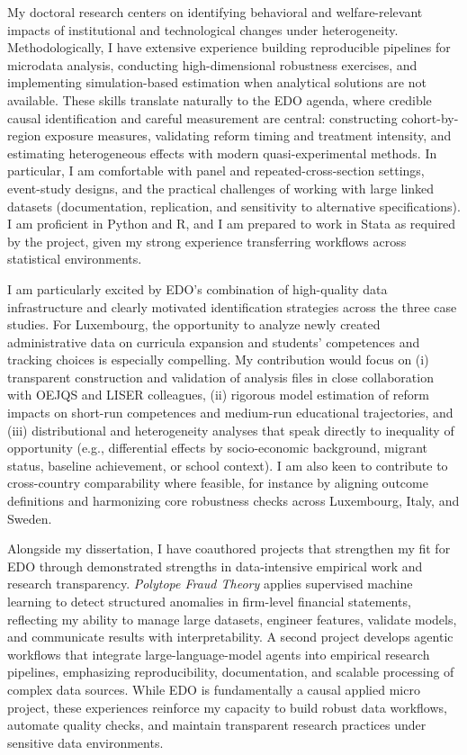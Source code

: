 \documentclass[11pt]{article}
\begin{document}
My doctoral research centers on identifying behavioral and welfare-relevant impacts of institutional and technological changes under heterogeneity. Methodologically, I have extensive experience building reproducible pipelines for microdata analysis, conducting high-dimensional robustness exercises, and implementing simulation-based estimation when analytical solutions are not available. These skills translate naturally to the EDO agenda, where credible causal identification and careful measurement are central: constructing cohort-by-region exposure measures, validating reform timing and treatment intensity, and estimating heterogeneous effects with modern quasi-experimental methods. In particular, I am comfortable with panel and repeated-cross-section settings, event-study designs, and the practical challenges of working with large linked datasets (documentation, replication, and sensitivity to alternative specifications). I am proficient in Python and R, and I am prepared to work in Stata as required by the project, given my strong experience transferring workflows across statistical environments.

I am particularly excited by EDO's combination of high-quality data infrastructure and clearly motivated identification strategies across the three case studies. For Luxembourg, the opportunity to analyze newly created administrative data on curricula expansion and students' competences and tracking choices is especially compelling. My contribution would focus on (i) transparent construction and validation of analysis files in close collaboration with OEJQS and LISER colleagues, (ii) rigorous model estimation of reform impacts on short-run competences and medium-run educational trajectories, and (iii) distributional and heterogeneity analyses that speak directly to inequality of opportunity (e.g., differential effects by socio-economic background, migrant status, baseline achievement, or school context). I am also keen to contribute to cross-country comparability where feasible, for instance by aligning outcome definitions and harmonizing core robustness checks across Luxembourg, Italy, and Sweden.

Alongside my dissertation, I have coauthored projects that strengthen my fit for EDO through demonstrated strengths in data-intensive empirical work and research transparency. \textit{Polytope Fraud Theory} applies supervised machine learning to detect structured anomalies in firm-level financial statements, reflecting my ability to manage large datasets, engineer features, validate models, and communicate results with interpretability. A second project develops agentic workflows that integrate large-language-model agents into empirical research pipelines, emphasizing reproducibility, documentation, and scalable processing of complex data sources. While EDO is fundamentally a causal applied micro project, these experiences reinforce my capacity to build robust data workflows, automate quality checks, and maintain transparent research practices under sensitive data environments.
\end{document}
